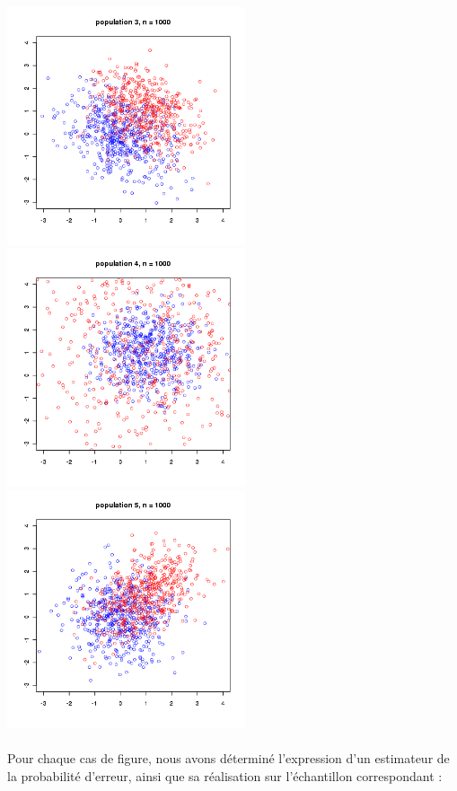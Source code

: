 \documentclass[a4paper, 10pt]{article}
\begin{document}
\includegraphics[height = 7cm, width = 7cm]{plots/exo1_simul_3.png}
\includegraphics[height = 7cm, width = 7cm]{plots/exo1_simul_4.png}\\
\includegraphics[height = 7cm, width = 7cm]{plots/exo1_simul_5.png}\\ \\
Pour chaque cas de figure, nous avons déterminé l'expression d'un estimateur de la probabilité d'erreur,
ainsi que sa réalisation sur l'échantillon correspondant :\\
\end{document}
